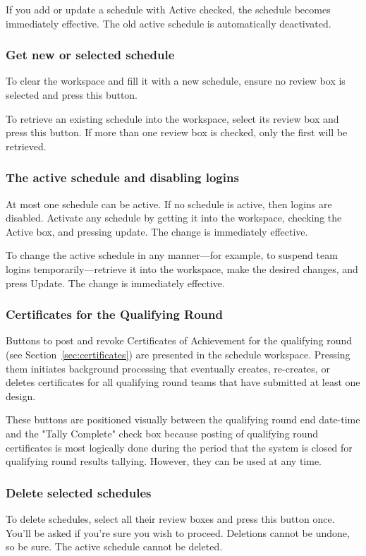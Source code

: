 \documentclass[11pt,letterpaper]{refart}
\def\ui#1{\textsf{#1}}
\begin{document}
If you add or update a schedule with \ui{Active} checked, the schedule
becomes immediately effective. The old active schedule is
automatically deactivated.

\subsubsection{Get new or selected schedule}
To clear the workspace and fill it with a new schedule, ensure no
review box is selected and press this button.

To retrieve an existing schedule into the workspace, select its review
box and press this button. If more than one review box is checked,
only the first will be retrieved.

\subsubsection{The active schedule and disabling logins}
At most one schedule can be active. If no schedule is active, then
logins are disabled. Activate any schedule by getting it into the
workspace, checking the \ui{Active} box, and pressing \ui{update}. The
change is immediately effective.

To change the active schedule in any manner---for example, to suspend
team logins temporarily---retrieve it into the workspace, make the
desired changes, and press \ui{Update}. The change is immediately
effective.

\subsubsection{Certificates for the Qualifying Round}
Buttons to post and revoke Certificates of Achievement
for the qualifying round (see Section~\ref{sec:certificates})
are presented in the schedule workspace. Pressing them initiates
background processing that eventually creates, re-creates, or deletes
certificates for all qualifying round teams that have submitted at
least one design.

These buttons are positioned visually between the qualifying round end
date-time and the "Tally Complete" check box because posting of
qualifying round certificates is most logically done during the period
that the system is closed for qualifying round results tallying. However,
they can be used at any time.

\subsubsection{Delete selected schedules}
To delete schedules, select all their review boxes and press this
button once. You'll be asked if you're sure you wish to
proceed. Deletions cannot be undone, so be sure. The active schedule
cannot be deleted.
\end{document}
